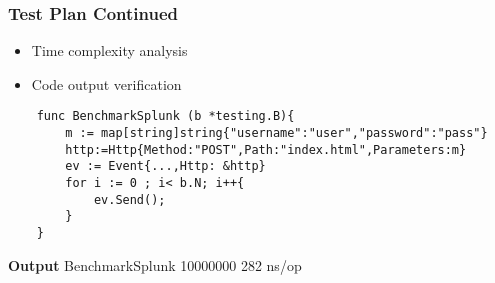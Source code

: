 \begin{frame}[fragile]
\frametitle{Test Plan Continued}
\begin{itemize} %
	\item Time complexity analysis
	\item Code output verification
	\end{itemize}

\begin{example} %
\begin{verbatim}
	func BenchmarkSplunk (b *testing.B){
		m := map[string]string{"username":"user","password":"pass"}
		http:=Http{Method:"POST",Path:"index.html",Parameters:m}
		ev := Event{...,Http: &http}
		for i := 0 ; i< b.N; i++{
			ev.Send();
		}
	}
\end{verbatim}
\end{example}
	\textbf{Output}
	BenchmarkSplunk    10000000    282 ns/op


\end{frame}

